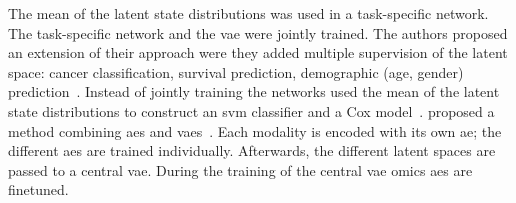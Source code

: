 \documentclass[../main.tex]{subfiles}
\begin{document}
	    The mean of the latent state distributions was used in a task-specific network.
	    The task-specific network and the \gls{vae} were jointly trained.
	    The authors proposed an extension of their approach were they added multiple supervision of the latent space: cancer classification, survival prediction, demographic (age, gender) prediction~\cite{Zhang2021}.
	    Instead of jointly training the networks \citeauthor{Hira2021} used the mean of the latent state distributions to construct an \gls{svm} classifier and a Cox model~\cite{Hira2021}.
	    \citeauthor{customics} proposed a method combining \glspl{ae} and \glspl{vae}~\cite{customics}.
	    Each modality is encoded with its own \gls{ae}; the different \glspl{ae} are trained individually.
	    Afterwards, the different latent spaces are passed to a central \gls{vae}.
	    During the training of the central \gls{vae} omics \glspl{ae} are finetuned.
\end{document}
